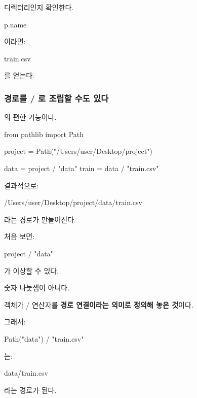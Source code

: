 디렉터리인지 확인한다.

\begin{dhkcode}
p.name
\end{dhkcode}

이라면:

\begin{dhkzsh}
train.csv
\end{dhkzsh}

를 얻는다.

\subsubsection{경로를 / 로 조립할 수도 있다}

의 편한 기능이다.

\begin{dhkcode}
from pathlib import Path

project = Path("/Users/user/Desktop/project")

data = project / "data"
train = data / "train.csv"
\end{dhkcode}

결과적으로:

\begin{dhkzsh}
/Users/user/Desktop/project/data/train.csv
\end{dhkzsh}

라는 경로가 만들어진다.

처음 보면:

\begin{dhkcode}
project / "data"
\end{dhkcode}

가 이상할 수 있다.

숫자 나눗셈이 아니다.

\begin{dhknote}
\begin{dhksmry}[centered]
객체가 / 연산자를 \textbf{경로 연결이라는 의미로 정의해 놓은 것}이다.
\end{dhksmry}
\end{dhknote}

그래서:

\begin{dhkcode}
Path("data") / "train.csv"
\end{dhkcode}

는:

\begin{dhkzsh}
data/train.csv
\end{dhkzsh}

라는 경로가 된다.


